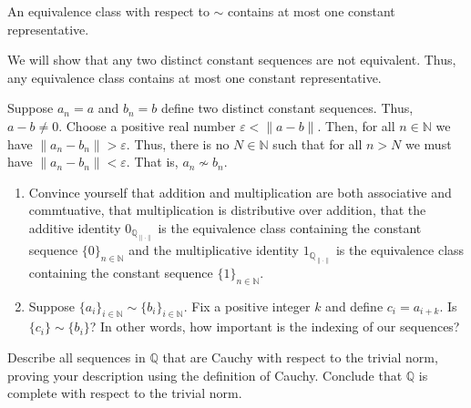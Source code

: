\documentclass[12 pt, letterpaper]{hmcpset}
\begin{document}
\pagebreak

\begin{problem}[(8)]
	An equivalence class with respect to $\sim$ contains at most one constant representative.
\end{problem}

\begin{solution}
	We will show that any two distinct constant sequences are not equivalent. Thus, any equivalence class contains at most one constant representative.

	Suppose $a_{n} = a$ and $b_{n} = b$ define two distinct constant sequences. Thus, $a - b \neq 0$. Choose a positive real number $\varepsilon < \lVert a - b \rVert$. Then, for all $n \in \mathbb{N}$ we have $\lVert a_{n} - b_{n} \rVert > \varepsilon$. Thus, there is no $N \in \mathbb{N}$ such that for all $n > N$ we must have $\lVert a_{n} - b_{n} \rVert < \varepsilon$. That is, $a_{n} \not \sim b_{n}$.
\end{solution}

\pagebreak

\begin{problem} 
	\begin{enumerate}
		\item Convince yourself that addition and multiplication are both associative and commtuative, that multiplication is distributive over addition, that the additive identity $0_{\mathbb{Q}_{\lVert \cdot \rVert}}$ is the equivalence class containing the constant sequence $\{ 0 \}_{n \in \mathbb{N}}$ and the multiplicative identity $1_{\mathbb{Q}_{\lVert \cdot \rVert}}$ is the equivalence class containing the constant sequence $\{ 1 \}_{n \in \mathbb{N}}$.

		\item Suppose $\{ a_{i} \}_{i \in \mathbb{N}} \sim \{ b_{i} \}_{i \in \mathbb{N}}$. Fix a positive integer $k$ and define $c_{i} = a_{i + k}$. Is $\{ c_{i} \} \sim \{ b_{i} \}$? In other words, how important is the indexing of our sequences?
	\end{enumerate}
\end{problem}

\pagebreak

\begin{problem}[(10)]
	Describe all sequences in $\mathbb{Q}$ that are Cauchy with respect to the trivial norm, proving your description using the definition of Cauchy. Conclude that $\mathbb{Q}$ is complete with respect to the trivial norm.
\end{problem}
\end{document}
